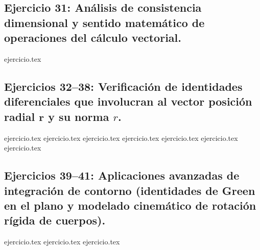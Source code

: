 \subsection*{Ejercicio 31: Análisis de consistencia dimensional y sentido matemático de operaciones del cálculo vectorial.}
\begin{enumerate}
    \setcounter{enumi}{30}
    {ejercicio.tex}
\end{enumerate}

\subsection*{Ejercicios 32--38: Verificación de identidades diferenciales que involucran al vector posición radial $\mathbf{r}$ y su norma $r$.}
\begin{enumerate}
    \setcounter{enumi}{31}
    {ejercicio.tex}
    {ejercicio.tex}
    {ejercicio.tex}
    {ejercicio.tex}
    {ejercicio.tex}
    {ejercicio.tex}
    {ejercicio.tex}
\end{enumerate}

\subsection*{Ejercicios 39--41: Aplicaciones avanzadas de integración de contorno (identidades de Green en el plano y modelado cinemático de rotación rígida de cuerpos).}
\begin{enumerate}
    \setcounter{enumi}{38}
    {ejercicio.tex}
    {ejercicio.tex}
    {ejercicio.tex}
\end{enumerate}

